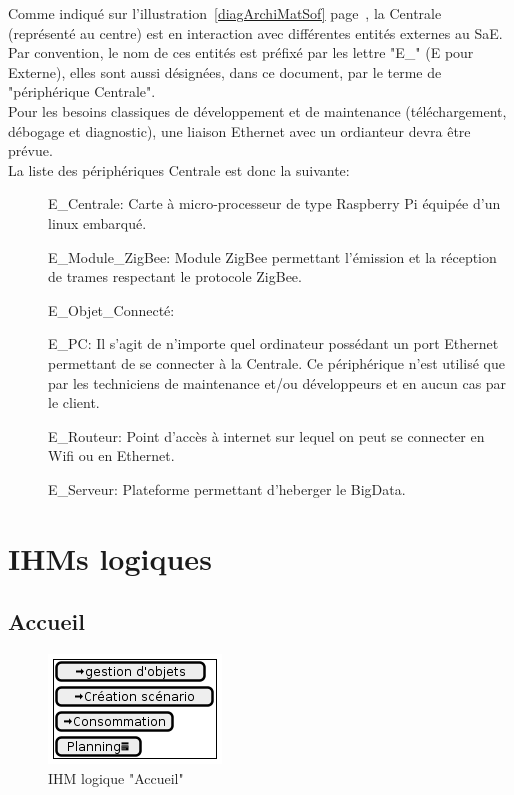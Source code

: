 \documentclass[10pt,a4paper]{report}
\begin{document}
Comme indiqué sur l'illustration~\ref{diagArchiMatSof} page~\pageref{diagArchiMatSof}, la Centrale (représenté au centre) est en interaction avec différentes entités externes au SaE. Par convention, le nom de ces entités est préfixé par les lettre "E\_" (E pour Externe), elles sont aussi désignées, dans ce document, par le terme de "périphérique Centrale". \\

Pour les besoins classiques de développement et de maintenance (téléchargement, débogage et diagnostic), une liaison Ethernet avec un ordianteur devra être prévue.\\

La liste des périphériques Centrale est donc la suivante:

\begin{description}
	\item[\textbf{\textperiodcentered}] E\_Centrale: Carte à micro-processeur de type Raspberry Pi équipée d'un linux embarqué.
	\item[\textbf{\textperiodcentered}] E\_Module\_ZigBee: Module ZigBee permettant l'émission et la réception de trames respectant le protocole ZigBee.
	\item[\textbf{\textperiodcentered}] E\_Objet\_Connecté: %
	\item[\textbf{\textperiodcentered}] E\_PC: Il s'agit de n'importe quel ordinateur possédant un port Ethernet permettant de se connecter à la Centrale. Ce périphérique n'est utilisé que par les techniciens de maintenance et/ou développeurs et en aucun cas par le client.
	\item[\textbf{\textperiodcentered}] E\_Routeur: Point d'accès à internet sur lequel on peut se connecter en Wifi ou en Ethernet.
	\item[\textbf{\textperiodcentered}] E\_Serveur: Plateforme permettant d'heberger le BigData.
\end{description}

	\chapter{IHMs logiques}
	
		\section{Accueil}
	
\begin{figure}[H]
	\centering
	\includegraphics[scale=0.55]{Accueil}
	\caption{IHM logique "Accueil"}
	\label{ihmLogiqueAccueil}
\end{figure}
\end{document}
